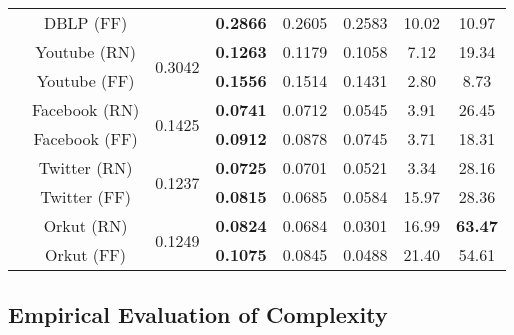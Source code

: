 \documentclass[format=acmsmall, review=false, screen=true]{acmart}
\begin{document}
\begin{table}[t]
{\begin{tabular}{|c|c|c|c|c|c|c|c|}
\multicolumn{1}{|c|}{}                              & DBLP (FF)  &                                          
& {\bf 0.2866}                                                               & 0.2605 & 0.2583 & 10.02                                             & 10.97              \\
\cline{2-8} 
\multicolumn{1}{|c|}{}                              & Youtube (RN)   & \multirow{2}{*}{0.3042}                                          & {\bf 0.1263}                                                               & 0.1179 & 0.1058 & 7.12                                             & 19.34                                          \\
\multicolumn{1}{|c|}{}                              & Youtube (FF)    &                                        
& {\bf 0.1556 }                                                              & 0.1514 & 0.1431 & 2.80                                             & 8.73                                           \\
\cline{2-8} 
\multicolumn{1}{|c|}{} & Facebook (RN)                                           
& \multirow{2}{*}{0.1425}  & {\bf 0.0741}     & 0.0712 & 0.0545 & 3.91 & 26.45                                              \\
\multicolumn{1}{|c|}{} & Facebook (FF)    
&  & {\bf 0.0912} & 0.0878& 0.0745& 3.71 & 18.31                                           
\\
\cline{2-8} 
\multicolumn{1}{|c|}{} & Twitter (RN)                                           
& \multirow{2}{*}{0.1237}  & {\bf 0.0725}     & 0.0701 & 0.0521 & 3.34 & 28.16                                              \\
\multicolumn{1}{|c|}{} & Twitter (FF)    
&  & {\bf 0.0815} & 0.0685& 0.0584& 15.97 & 28.36                                           
\\
\cline{2-8} 
\multicolumn{1}{|c|}{} & Orkut (RN)                                           
& \multirow{2}{*}{0.1249}  & {\bf 0.0824}     & 0.0684 & 0.0301 & 16.99 & {\bf 63.47}                                              \\
\multicolumn{1}{|c|}{} & Orkut (FF)    
&  & {\bf 0.1075} & 0.0845 & 0.0488 & 21.40 & 54.61                                           
\\
\hline
\end{tabular}
}
\egroup
\end{table} 

\subsection{Empirical Evaluation of Complexity}
\end{document}
